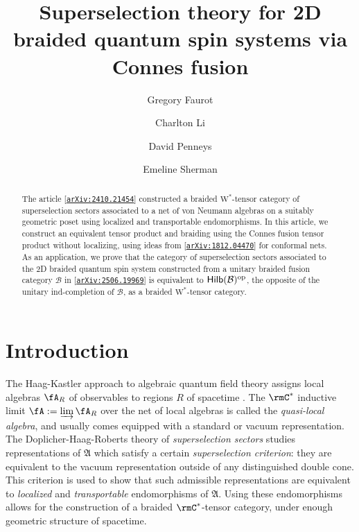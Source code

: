 \documentclass[11pt,reqno]{amsart}
\title{Superselection theory for 2D braided quantum spin systems via Connes fusion}
\author[G.~Faurot]{Gregory Faurot}
\author[C.~Li]{Charlton Li}
\author[D.~Penneys]{David Penneys}
\author[E.~Sherman]{Emeline Sherman}
\newcommand{\arxiv}[1]{\href{http://arxiv.org/abs/#1}{\tt arXiv:\nolinkurl{#1}}}
\numberwithin{equation}{section}
\theoremstyle{plain}
\theoremstyle{definition}
\begin{document}
\begin{abstract}
The article [\arxiv{2410.21454}] constructed a braided $\mathrm{W^*}$-tensor category of superselection sectors associated to a net of von Neumann algebras on a suitably geometric poset using localized and transportable endomorphisms.
In this article, we construct an equivalent tensor product and braiding using the Connes fusion tensor product without localizing, using ideas from [\arxiv{1812.04470}] for conformal nets.
As an application, we prove that the category of superselection sectors associated to the 2D braided quantum spin system constructed from a unitary braided fusion category $\mathcal{B}$ in [\arxiv{2506.19969}] is equivalent to $\mathsf{Hilb}(\mathcal{B})^{\rm op}$, the opposite of the unitary ind-completion of $\mathcal{B}$, as a braided $\mathrm{W^*}$-tensor category.
\end{abstract}

\maketitle

\section{Introduction}
The Haag-Kastler approach to algebraic quantum field theory assigns local algebras $\fA_R$ of observables to regions $R$ of spacetime \cite{MR165864}.
The $\rmC^*$ inductive limit $\fA:=\varinjlim \fA_R$ over the net of local algebras is called the \emph{quasi-local algebra}, and usually comes equipped with a standard or vacuum representation.
The Doplicher-Haag-Roberts theory of \emph{superselection sectors} \cite{MR0297259} studies representations of $\mathfrak{A}$ which satisfy a certain \emph{superselection criterion}: they are equivalent to the vacuum representation outside of any distinguished double cone.
This criterion is used to show that such admissible representations are equivalent to \emph{localized} and \emph{transportable} endomorphisms of $\mathfrak{A}$. 
Using these endomorphisms allows for the construction of a braided $\rmC^*$-tensor category, under enough geometric structure of spacetime.
\end{document}
